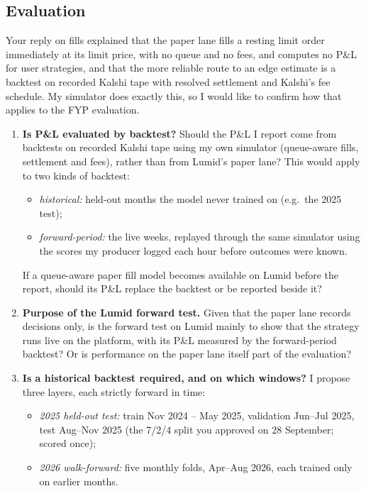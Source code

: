 \documentclass[11pt,a4paper]{article}
\begin{document}
\subsection*{Evaluation}
Your reply on fills explained that the paper lane fills a resting limit order immediately at its limit price, with
no queue and no fees, and computes no P\&L for user strategies, and that the more reliable route to an edge
estimate is a backtest on recorded Kalshi tape with resolved settlement and Kalshi's fee schedule. My simulator does
exactly this, so I would like to confirm how that applies to the FYP evaluation.
\begin{enumerate}
  \item \textbf{Is P\&L evaluated by backtest?} Should the P\&L I report come from backtests on recorded Kalshi tape
        using my own simulator (queue-aware fills, settlement and fees), rather than from Lumid's paper lane? This
        would apply to two kinds of backtest:
        \begin{itemize}
          \item \emph{historical:} held-out months the model never trained on (e.g.\ the 2025 test);
          \item \emph{forward-period:} the live weeks, replayed through the same simulator using the scores my
                producer logged each hour before outcomes were known.
        \end{itemize}
        If a queue-aware paper fill model becomes available on Lumid before the report, should its P\&L replace
        the backtest or be reported beside it?
  \item \textbf{Purpose of the Lumid forward test.} Given that the paper lane records decisions only, is the forward
        test on Lumid mainly to show that the strategy runs live on the platform, with its P\&L measured by the
        forward-period backtest? Or is performance on the paper lane itself part of the evaluation?
  \item \textbf{Is a historical backtest required, and on which windows?} I propose three layers, each strictly
        forward in time:
        \begin{itemize}
          \item \emph{2025 held-out test:} train Nov 2024 -- May 2025, validation Jun--Jul 2025, test Aug--Nov 2025
                (the 7/2/4 split you approved on 28 September; scored once);
          \item \emph{2026 walk-forward:} five monthly folds, Apr--Aug 2026, each trained only on earlier months.

\end{itemize}
\end{enumerate}
\end{document}
